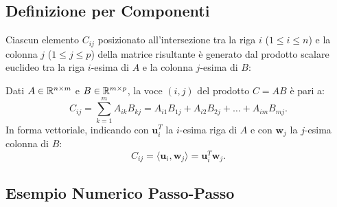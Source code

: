 \subsection{Definizione per Componenti}

Ciascun elemento $C_{ij}$ posizionato all'intersezione tra la riga $i$ ($1 \le i \le n$) e la colonna $j$ ($1 \le j \le p$) della matrice risultante \`e generato dal prodotto scalare euclideo tra la riga $i$-esima di $A$ e la colonna $j$-esima di $B$:

\begin{definition}
Dati $A \in \mathbb{R}^{n \times m}$ e $B \in \mathbb{R}^{m \times p}$, la voce $(i,j)$ del prodotto $C = AB$ \`e pari a:
\begin{equation}
    C_{ij} = \sum_{k=1}^m A_{ik} B_{kj} = A_{i1}B_{1j} + A_{i2}B_{2j} + \dots + A_{im}B_{mj}.
\end{equation}
In forma vettoriale, indicando con $\mathbf{u}_i^T$ la $i$-esima riga di $A$ e con $\mathbf{w}_j$ la $j$-esima colonna di $B$:
\begin{equation}
    C_{ij} = \langle \mathbf{u}_i, \mathbf{w}_j \rangle = \mathbf{u}_i^T \mathbf{w}_j.
\end{equation}
\end{definition}

\subsection{Esempio Numerico Passo-Passo}

